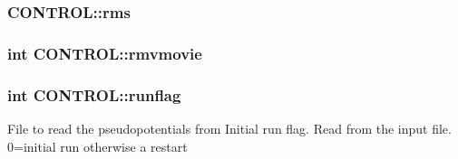 \hypertarget{struct_c_o_n_t_r_o_l_aa889e2e03322b6b85e872895d95109e1}{
\subsubsection[{rms}]{ C\-O\-N\-T\-R\-O\-L\-::rms}}\label{struct_c_o_n_t_r_o_l_aa889e2e03322b6b85e872895d95109e1}
\hypertarget{struct_c_o_n_t_r_o_l_a5a8b93668929030fade55724acc0e6c0}{
\subsubsection[{rmvmovie}]{\setlength{\rightskip}{0pt plus 5cm}int C\-O\-N\-T\-R\-O\-L\-::rmvmovie}}\label{struct_c_o_n_t_r_o_l_a5a8b93668929030fade55724acc0e6c0}
\hypertarget{struct_c_o_n_t_r_o_l_af9d366617e951c66f897c61ec028b3ab}{
\subsubsection[{runflag}]{\setlength{\rightskip}{0pt plus 5cm}int C\-O\-N\-T\-R\-O\-L\-::runflag}}\label{struct_c_o_n_t_r_o_l_af9d366617e951c66f897c61ec028b3ab}
File to read the pseudopotentials from Initial run flag. Read from the input file. 0=initial run otherwise a restart


